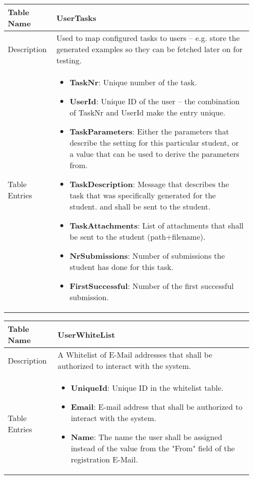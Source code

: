 \begin{tabular}{|p{3cm}|p{10cm}|}
\hline
Table Name & UserTasks \\
\hline
Description & Used to map configured tasks to users -- e.g. store the generated examples so they can be 
    fetched later on for testing.\\
\hline
Table Entries & \begin{itemize}
    \item {\bf TaskNr}: Unique number of the task.
    \item {\bf UserId}: Unique ID of the user -- the combination of TaskNr and UserId make the entry unique.
    \item {\bf TaskParameters}: Either the parameters that describe the setting for this particular student, or a value that can be
        used to derive the parameters from.
    \item {\bf TaskDescription}: Message that describes the task that was specifically generated for the student.
        and shall be sent to the student.
    \item {\bf TaskAttachments}: List of attachments that shall be sent to the student (path+filename).
    \item {\bf NrSubmissions}: Number of submissions the student has done for this task.
    \item {\bf FirstSuccessful}: Number of the first successful submission.
\end{itemize} \\
\hline
\end{tabular}

\begin{tabular}{|p{3cm}|p{10cm}|}
\hline
Table Name & UserWhiteList \\
\hline
Description & A Whitelist of E-Mail addresses that shall be authorized to interact with the system.\\
\hline
Table Entries & \begin{itemize}
        \item {\bf UniqueId}: Unique ID in the whitelist table.
        \item {\bf Email}: E-mail address that shall be authorized to interact with the system.
		\item {\bf Name}: The name the user shall be assigned instead of the value from the
			"From" field of the registration E-Mail.
        \end{itemize} \\
\hline
\end{tabular}

